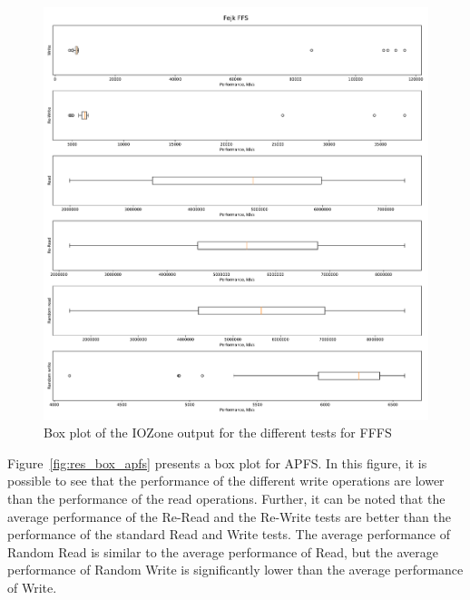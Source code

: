 \begin{figure}[!htb]
	\label{fig:res_box_fffs}
	\begin{center}
		\includegraphics[width=1.0\textwidth]{figures/benchmarking/fake-ffs/Fejk FFS-box.pdf}
	\end{center}
	\caption{Box plot of the IOZone output for the different tests for FFFS}
\end{figure}

Figure~\ref{fig:res_box_apfs} presents a box plot for APFS. In this figure, it is possible to see that the performance of the different write operations are lower than the performance of the read operations. Further, it can be noted that the average performance of the Re-Read and the Re-Write tests are better than the performance of the standard Read and Write tests. The average performance of Random Read is similar to the average performance of Read, but the average performance of Random Write is significantly lower than the average performance of Write.


